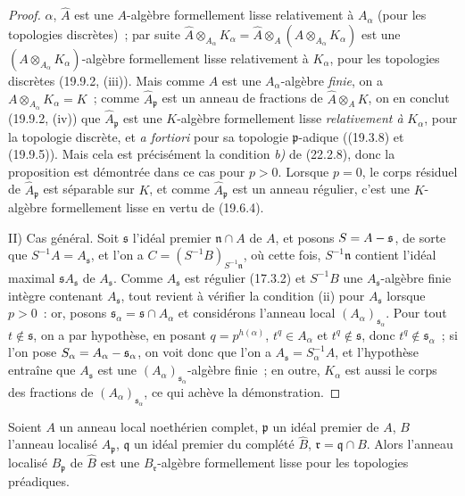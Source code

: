 \begin{proof}
$\alpha$, $\widehat A$ est une $A$-algèbre formellement lisse relativement
à $A_\alpha$ (pour les topologies discrètes)~; par suite
$\widehat A\otimes_{A_\alpha}K_\alpha=\widehat A\otimes_A(A\otimes_{A_\alpha}K_\alpha)$
est une $(A\otimes_{A_\alpha}K_\alpha)$-algèbre formellement lisse
relativement à $K_\alpha$, pour les topologies discrètes (19.9.2, (iii)).
Mais comme $A$ est une $A_\alpha$-algèbre \emph{finie}, on a
$A\otimes_{A_\alpha}K_\alpha=K$~; comme $\widehat A_\mathfrak p$ est un
anneau de fractions de $\widehat A\otimes_A K$, on en conclut (19.9.2,
(iv)) que $\widehat A_\mathfrak p$ est une $K$-algèbre formellement lisse
\emph{relativement à} $K_\alpha$, pour la topologie discrète, et \emph{a fortiori}
pour sa topologie $\mathfrak p$-adique ((19.3.8) et (19.9.5)). Mais cela est
précisément la condition \emph{b)} de (22.2.8), donc la proposition est démontrée
dans ce cas pour $p>0$. Lorsque $p=0$, le corps résiduel de
$\widehat A_\mathfrak p$ est séparable sur $K$, et comme
$\widehat A_\mathfrak p$ est un anneau régulier, c'est une $K$-algèbre
formellement lisse en vertu de (19.6.4).

II) Cas général. Soit $\mathfrak s$ l'idéal premier $\mathfrak n\cap A$ de
$A$, et posons $S=A-\mathfrak s$, de sorte que $S^{-1}A=A_\mathfrak s$, et
l'on a $C=(S^{-1}B)_{S^{-1}\mathfrak n}$, où cette fois,
$S^{-1}\mathfrak n$ contient l'idéal maximal
$\mathfrak sA_\mathfrak s$ de $A_\mathfrak s$. Comme $A_\mathfrak s$ est
régulier (17.3.2) et $S^{-1}B$ une $A_\mathfrak s$-algèbre finie intègre
contenant $A_\mathfrak s$, tout revient à vérifier la condition (ii) pour
$A_\mathfrak s$ lorsque $p>0$~: or, posons
$\mathfrak s_\alpha=\mathfrak s\cap A_\alpha$ et considérons l'anneau local
$(A_\alpha)_{\mathfrak s_\alpha}$. Pour tout $t\notin\mathfrak s$, on a par
hypothèse, en posant $q=p^{h(\alpha)}$, $t^q\in A_\alpha$ et
$t^q\notin\mathfrak s$, donc $t^q\notin\mathfrak s_\alpha$~; si l'on pose
$S_\alpha=A_\alpha-\mathfrak s_\alpha$, on voit donc que l'on a
$A_\mathfrak s=S_\alpha^{-1}A$, et l'hypothèse entraîne que
$A_\mathfrak s$ est une $(A_\alpha)_{\mathfrak s_\alpha}$-algèbre finie~;
en outre, $K_\alpha$ est aussi le corps des fractions de
$(A_\alpha)_{\mathfrak s_\alpha}$, ce qui achève la démonstration.
\end{proof}

\begin{theorem}[22.3.3]
\label{0.22.3.3-fr}
Soient $A$ un anneau local noethérien \textup{complet}, $\mathfrak p$ un idéal
premier de $A$, $B$ l'anneau localisé $A_\mathfrak p$, $\mathfrak q$ un
idéal premier du complété $\widehat B$, $\mathfrak r=\mathfrak q\cap B$.
Alors l'anneau localisé $\widehat B_\mathfrak p$ de $\widehat B$ est une
$B_\mathfrak r$-algèbre formellement lisse pour les topologies préadiques.
\end{theorem}

